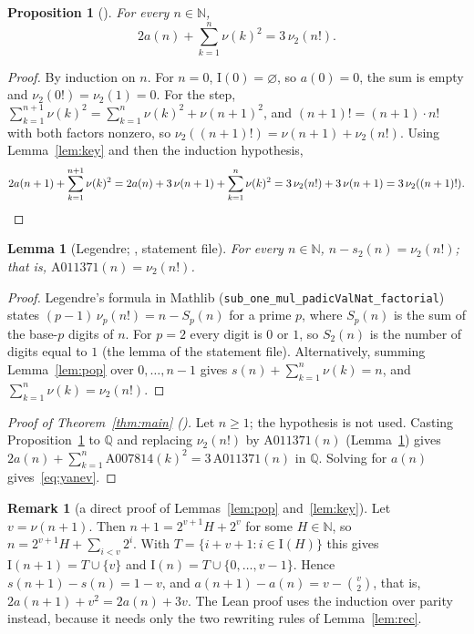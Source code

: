 \documentclass[11pt]{amsart}
\theoremstyle{plain}
\newtheorem{lemma}[theorem]{Lemma}
\newtheorem{proposition}[theorem]{Proposition}
\theoremstyle{definition}
\newtheorem{remark}[theorem]{Remark}
\newcommand{\N}{\mathbb{N}}
\newcommand{\Q}{\mathbb{Q}}
\newcommand{\vt}{\nu_2}
\newcommand{\Bits}{\mathrm{I}}
\begin{document}
\begin{proposition}[]\label{prop:main}
For every $n\in\N$,
\[
  2a(n)+\sum_{k=1}^{n}\nu(k)^2=3\,\vt(n!).
\]
\end{proposition}

\begin{proof}
By induction on $n$. For $n=0$, $\Bits(0)=\varnothing$, so $a(0)=0$, the sum is empty and $\vt(0!)=\vt(1)=0$. For the step, $\sum_{k=1}^{n+1}\nu(k)^2=\sum_{k=1}^{n}\nu(k)^2+\nu(n+1)^2$, and $(n+1)!=(n+1)\cdot n!$ with both factors nonzero, so $\vt((n+1)!)=\nu(n+1)+\vt(n!)$. Using Lemma~\ref{lem:key} and then the induction hypothesis,
\[
  2a(n+1)+\sum_{k=1}^{n+1}\nu(k)^2
  = 2a(n)+3\,\nu(n+1)+\sum_{k=1}^{n}\nu(k)^2
  = 3\,\vt(n!)+3\,\nu(n+1)=3\,\vt((n+1)!). \qedhere
\]
\end{proof}

\begin{lemma}[Legendre; , statement file]\label{lem:legendre}
For every $n\in\N$, $n-s_2(n)=\vt(n!)$; that is, $\mathrm{A011371}(n)=\vt(n!)$.
\end{lemma}

\begin{proof}
Legendre's formula \cite{Legendre} in Mathlib (\texttt{sub\_one\_mul\_padicValNat\_factorial}) states $(p-1)\,\nu_p(n!)=n-S_p(n)$ for a prime $p$, where $S_p(n)$ is the sum of the base-$p$ digits of $n$. For $p=2$ every digit is $0$ or $1$, so $S_2(n)$ is the number of digits equal to $1$ (the lemma  of the statement file). Alternatively, summing Lemma~\ref{lem:pop} over $0,\dots,n-1$ gives $s(n)+\sum_{k=1}^{n}\nu(k)=n$, and $\sum_{k=1}^{n}\nu(k)=\vt(n!)$.
\end{proof}

\begin{proof}[Proof of Theorem~\ref{thm:main} ()]
Let $n\ge1$; the hypothesis is not used. Casting Proposition~\ref{prop:main} to $\Q$ and replacing $\vt(n!)$ by $\mathrm{A011371}(n)$ (Lemma~\ref{lem:legendre}) gives $2a(n)+\sum_{k=1}^{n}\mathrm{A007814}(k)^2=3\,\mathrm{A011371}(n)$ in $\Q$. Solving for $a(n)$ gives~\eqref{eq:yanev}.
\end{proof}

\begin{remark}[a direct proof of Lemmas~\ref{lem:pop} and~\ref{lem:key}]\label{rem:carry}
Let $v=\nu(n+1)$. Then $n+1=2^{v+1}H+2^v$ for some $H\in\N$, so $n=2^{v+1}H+\sum_{i<v}2^i$. With $T=\{i+v+1:i\in\Bits(H)\}$ this gives $\Bits(n+1)=T\cup\{v\}$ and $\Bits(n)=T\cup\{0,\dots,v-1\}$. Hence $s(n+1)-s(n)=1-v$, and $a(n+1)-a(n)=v-\binom{v}{2}$, that is, $2a(n+1)+v^2=2a(n)+3v$. The Lean proof uses the induction over parity instead, because it needs only the two rewriting rules of Lemma~\ref{lem:rec}.
\end{remark}
\end{document}

